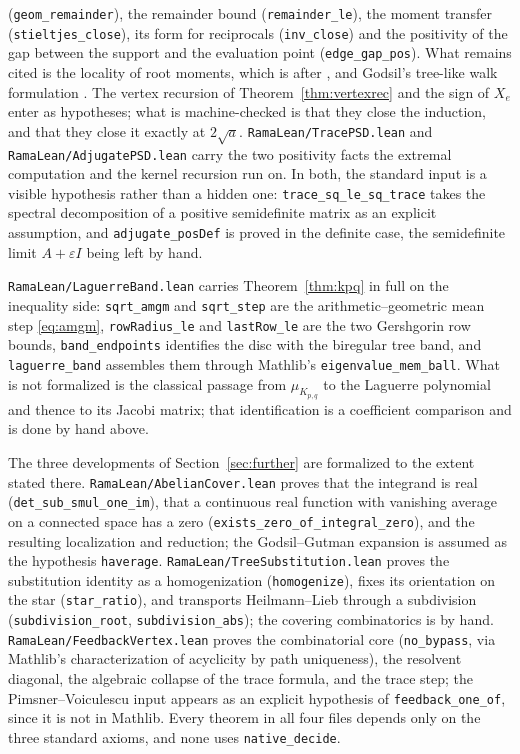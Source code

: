 \documentclass[11pt]{article}
\theoremstyle{remark}
\begin{document}
(\texttt{geom\_remainder}), the remainder bound (\texttt{remainder\_le}), the moment
transfer (\texttt{stieltjes\_close}), its form for reciprocals (\texttt{inv\_close}) and the
positivity of the gap between the support and the evaluation point
(\texttt{edge\_gap\_pos}). What remains cited is the locality of root moments, which is
\cite{CsF} after \cite{AH}, and Godsil's tree-like walk formulation \cite{Go}. The vertex recursion of Theorem~\ref{thm:vertexrec} and the
sign of $X_e$ enter as hypotheses; what is machine-checked is that they close the
induction, and that they close it exactly at $2\sqrt a$.
\texttt{RamaLean/TracePSD.lean} and
\texttt{RamaLean/AdjugatePSD.lean} carry the two positivity facts the extremal
computation and the kernel recursion run on. In both, the standard input is a
visible hypothesis rather than a hidden one: \texttt{trace\_sq\_le\_sq\_trace}
takes the spectral decomposition of a positive semidefinite matrix as an explicit
assumption, and \texttt{adjugate\_posDef} is proved in the definite case, the
semidefinite limit $A+\varepsilon I$ being left by hand.

\texttt{RamaLean/LaguerreBand.lean} carries Theorem~\ref{thm:kpq} in full on the
inequality side: \texttt{sqrt\_amgm} and \texttt{sqrt\_step} are the arithmetic--geometric
mean step \eqref{eq:amgm}, \texttt{rowRadius\_le} and \texttt{lastRow\_le} are the two
Gershgorin row bounds, \texttt{band\_endpoints} identifies the disc with the biregular
tree band, and \texttt{laguerre\_band} assembles them through Mathlib's
\texttt{eigenvalue\_mem\_ball}. What is not formalized is the classical passage from
$\mu_{K_{p,q}}$ to the Laguerre polynomial and thence to its Jacobi matrix; that
identification is a coefficient comparison and is done by hand above.

The three developments of Section~\ref{sec:further} are formalized to the extent stated
there. \texttt{RamaLean/AbelianCover.lean} proves that the integrand is real
(\texttt{det\_sub\_smul\_one\_im}), that a continuous real function with vanishing average
on a connected space has a zero (\texttt{exists\_zero\_of\_integral\_zero}), and the
resulting localization and reduction; the Godsil--Gutman expansion is assumed as the
hypothesis \texttt{haverage}. \texttt{RamaLean/TreeSubstitution.lean} proves the
substitution identity as a homogenization (\texttt{homogenize}), fixes its orientation on
the star (\texttt{star\_ratio}), and transports Heilmann--Lieb through a subdivision
(\texttt{subdivision\_root}, \texttt{subdivision\_abs}); the covering combinatorics is by
hand. \texttt{RamaLean/FeedbackVertex.lean} proves the combinatorial core
(\texttt{no\_bypass}, via Mathlib's characterization of acyclicity by path uniqueness), the
resolvent diagonal, the algebraic collapse of the trace formula, and the trace step; the
Pimsner--Voiculescu input appears as an explicit hypothesis of
\texttt{feedback\_one\_of}, since it is not in Mathlib. Every theorem in all four files
depends only on the three standard axioms, and none uses \texttt{native\_decide}.
\end{document}
